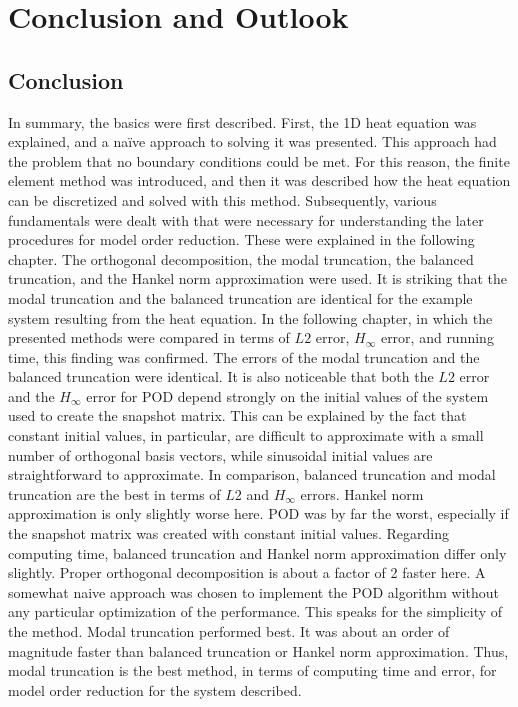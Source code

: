 \chapter{Conclusion and Outlook}
\section{Conclusion}
In summary, the basics were first described.
First, the 1D heat equation was explained, and a naïve approach to solving it was presented.
This approach had the problem that no boundary conditions could be met.
For this reason, the finite element method was introduced, and then it was described how the heat equation can be discretized and solved with this method.
Subsequently, various fundamentals were dealt with that were necessary for understanding the later procedures for model order reduction.
These were explained in the following chapter.
The orthogonal decomposition, the modal truncation, the balanced truncation, and the Hankel norm approximation were used.
It is striking that the modal truncation and the balanced truncation are identical for the example system resulting from the heat equation.
In the following chapter, in which the presented methods were compared in terms of \(L2\) error, \(H_{\infty}\) error, and running time, this finding was confirmed. The errors of the modal truncation and the balanced truncation were identical.
It is also noticeable that both the \(L2\) error and the \(H_{\infty}\) error for POD depend strongly on the initial values of the system used to create the snapshot matrix.
This can be explained by the fact that constant initial values, in particular, are difficult to approximate with a small number of orthogonal basis vectors, while sinusoidal initial values are straightforward to approximate.
In comparison, balanced truncation and modal truncation are the best in terms of \(L2\) and \(H_{\infty}\) errors. 
Hankel norm approximation is only slightly worse here.
POD was by far the worst, especially if the snapshot matrix was created with constant initial values.
Regarding computing time, balanced truncation and Hankel norm approximation differ only slightly. 
Proper orthogonal decomposition is about a factor of 2 faster here.
A somewhat naive approach was chosen to implement the POD algorithm without any particular optimization of the performance.
This speaks for the simplicity of the method.
Modal truncation performed best. 
It was about an order of magnitude faster than balanced truncation or Hankel norm approximation.
Thus, modal truncation is the best method, in terms of computing time and error, for model order reduction for the system described.
   
